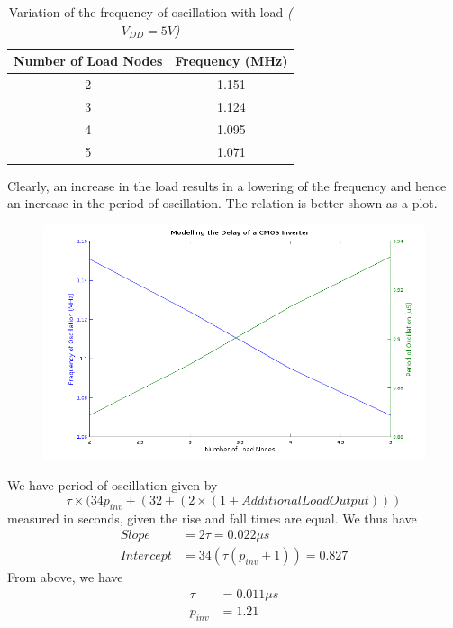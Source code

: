 \documentclass[a4paper, 11pt]{article}
\begin{document}
\begin{table}[H]
\centering
\begin{tabular}{| c | c |}
\hline
\bf Number of Load Nodes & \bf Frequency (MHz)\\
\hline
2 & 1.151 \\
3 & 1.124 \\
4 & 1.095 \\
5 & 1.071 \\
\hline
\end{tabular}
\caption{Variation of the frequency of oscillation with load {\em($V_{DD} = 5V$)}}
\end{table}
Clearly, an increase in the load results in a lowering of the frequency and hence an increase in the period of oscillation. The relation is better shown as a plot.\\
\begin{figure}[H]
\centering
\includegraphics[scale=0.55]{Delay_Char}
\caption{}
\end{figure}
\vspace*{2em}
We have period of oscillation given by
$$
\tau \times (34p_{inv} + (32 + (2\times (1 + Additional Load Output)))
$$
measured in seconds, given the rise and fall times are equal.
We thus have
\begin{equation*}
\begin{split}
Slope &= 2\tau = 0.022 \mu s \\
Intercept &= 34(\tau (p_{inv} + 1)) = 0.827
\end{split}
\end{equation*}
From above, we have 
\begin{equation*}
\begin{split}
\tau &= 0.011\mu s \\
p_{inv} &= 1.21
\end{split}
\end{equation*}
\end{document}
